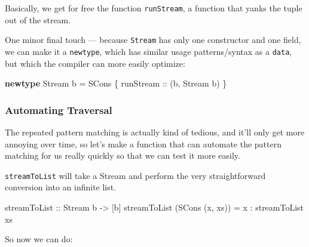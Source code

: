\documentclass[]{article}
\newenvironment{Shaded}{}{}
\newcommand{\KeywordTok}[1]{\textcolor[rgb]{0.00,0.44,0.13}{\textbf{{#1}}}}
\newcommand{\DataTypeTok}[1]{\textcolor[rgb]{0.56,0.13,0.00}{{#1}}}
\newcommand{\DecValTok}[1]{\textcolor[rgb]{0.25,0.63,0.44}{{#1}}}
\newcommand{\OtherTok}[1]{\textcolor[rgb]{0.00,0.44,0.13}{{#1}}}
\newcommand{\FunctionTok}[1]{\textcolor[rgb]{0.02,0.16,0.49}{{#1}}}
\newcommand{\NormalTok}[1]{{#1}}
\begin{document}
Basically, we get for free the function \texttt{runStream}, a function
that yanks the tuple out of the stream.

One minor final touch --- because \texttt{Stream} has only one
constructor and one field, we can make it a \texttt{newtype}, which has
similar usage patterns/syntax as a \texttt{data}, but which the compiler
can more easily optimize:

\begin{Shaded}
\begin{Highlighting}[]
\KeywordTok{newtype} \DataTypeTok{Stream} \NormalTok{b }\FunctionTok{=} \DataTypeTok{SCons} \NormalTok{\{}\OtherTok{ runStream ::} \NormalTok{(b, }\DataTypeTok{Stream} \NormalTok{b) \}}
\end{Highlighting}
\end{Shaded}

\subsubsection{Automating Traversal}\label{automating-traversal}

The repeated pattern matching is actually kind of tedious, and it'll
only get more annoying over time, so let's make a function that can
automate the pattern matching for us really quickly so that we can test
it more easily.

\texttt{streamToList} will take a Stream and perform the very
straightforward conversion into an infinite list.

\begin{Shaded}
\begin{Highlighting}[]
\OtherTok{streamToList ::} \DataTypeTok{Stream} \NormalTok{b }\OtherTok{->} \NormalTok{[b]}
\NormalTok{streamToList (}\DataTypeTok{SCons} \NormalTok{(x, xs)) }\FunctionTok{=} \NormalTok{x }\FunctionTok{:} \NormalTok{streamToList xs}
\end{Highlighting}
\end{Shaded}

So now we can do:

\begin{Shaded}
\end{Shaded}
\end{document}
